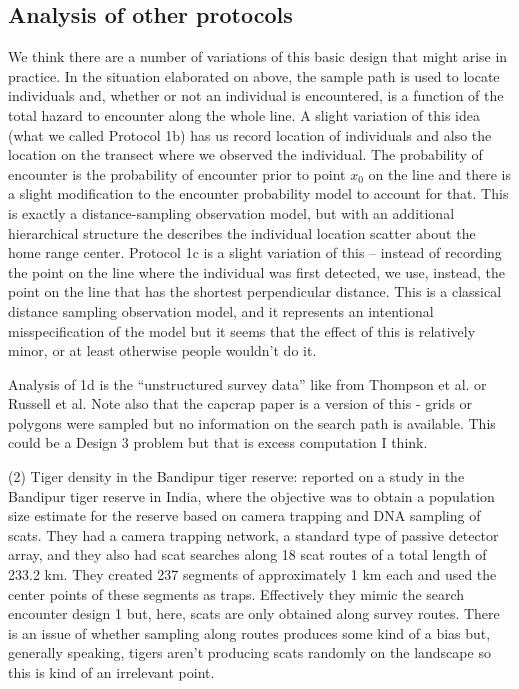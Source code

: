 \subsection{Analysis of other protocols}

We think there are a number of variations of this basic design that
might arise in practice.
In the situation elaborated on above,
the sample path is used to locate individuals and, whether or not an
individual is encountered, is a function of the total hazard to
encounter along the whole line.
A slight variation of this idea (what we called Protocol 1b)
has us record location of individuals and also the location on the
transect where we observed the individual.
The probability of encounter is the probability of encounter prior to
point $x_{0}$ on the line
\citep{skaug_schweder:1999}
and there
is a slight modification to the encounter probability model to account
for that. This is exactly a
 distance-sampling observation model, but with an
additional hierarchical structure the describes the individual
location scatter about the home range center.
Protocol 1c is a slight variation of this -- instead of recording the
point on the line where the individual was first detected, we use,
instead, the point on the line that has the shortest perpendicular
distance. This is a classical distance sampling observation model, and
it  represents an intentional misspecification of the model
but it seems that the effect of this is relatively minor, or at least
otherwise people wouldn't do it.

Analysis of 1d is the ``unstructured survey data'' like
from Thompson et al. or Russell et al.  Note also that the capcrap
paper is a version of this - grids or polygons were sampled but no
information on the search path is available. This could be a Design 3
problem but that is excess computation I think.


(2) Tiger density in the Bandipur tiger reserve:
\citet{gopalaswamy_etal:2012ecol} reported on a study in the Bandipur
tiger reserve in India, where the objective was to obtain a population
size estimate for the reserve based on camera trapping and DNA
sampling of scats.  They had a camera trapping network, a standard
type of passive detector array, and they also had scat searches along
18 scat routes of a total length of 233.2 km. They created 237
segments of approximately 1 km each and used the center points of
these segments as traps. Effectively they mimic the search encounter
design 1 but, here, scats are only obtained along survey routes.
There is an issue of whether sampling along routes produces some kind
of a bias but, generally speaking, tigers aren't producing scats
randomly on the landscape so this is kind of an irrelevant point.



